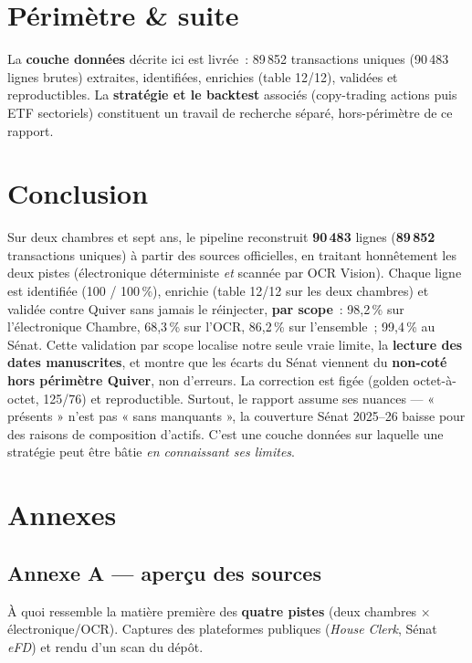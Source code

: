 \documentclass[11pt,a4paper]{article}
\begin{document}
\section{Périmètre \& suite}
La \textbf{couche données} décrite ici est livrée~: 89\,852 transactions uniques (90\,483 lignes brutes) extraites, identifiées,
enrichies (table 12/12), validées et reproductibles. La \textbf{stratégie et le backtest} associés
(copy-trading actions puis ETF sectoriels) constituent un travail de recherche séparé, hors-périmètre de
ce rapport.

\section{Conclusion}
Sur deux chambres et sept ans, le pipeline reconstruit \textbf{90\,483} lignes (\textbf{89\,852} transactions uniques) à partir des
sources officielles, en traitant honnêtement les deux pistes (électronique déterministe \emph{et}
scannée par OCR Vision). Chaque ligne est identifiée (100 / 100\,\%), enrichie (table 12/12 sur les
deux chambres) et validée contre Quiver sans jamais le réinjecter, \textbf{par scope}~: 98,2\,\% sur
l'électronique Chambre, 68,3\,\% sur l'OCR, 86,2\,\% sur l'ensemble~; 99,4\,\% au Sénat. Cette validation
par scope localise notre seule vraie limite, la \textbf{lecture des dates manuscrites}, et montre que les
écarts du Sénat viennent du \textbf{non-coté hors périmètre Quiver}, non d'erreurs. La correction est figée (golden
octet-à-octet, 125/76) et reproductible. Surtout, le rapport assume ses nuances — « présents » n'est pas
« sans manquants », la couverture Sénat 2025--26 baisse pour des raisons de composition d'actifs. C'est
une couche données sur laquelle une stratégie peut être bâtie \emph{en connaissant ses limites}.

\clearpage
\section{Annexes}

\subsection{Annexe A — aperçu des sources}
\label{anx:sources}
À quoi ressemble la matière première des \textbf{quatre pistes} (deux chambres × électronique/OCR).
Captures des plateformes publiques (\emph{House Clerk}, Sénat \emph{eFD}) et rendu d'un scan du dépôt.
\end{document}
